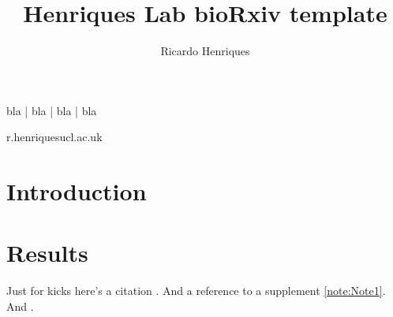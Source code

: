 \documentclass[times, twoside, watermark]{zHenriquesLab-StyleBioRxiv}
\begin{document}
\title{Henriques Lab bioRxiv template}

\author[1,\Letter]{Ricardo Henriques}


\maketitle

\begin{abstract}
\blindtext
\end {abstract}

\begin{keywords}
bla | bla | bla | bla
\end{keywords}

\begin{corrauthor}
r.henriques\at ucl.ac.uk
\end{corrauthor}

\section*{Introduction}
\Blindtext

\section*{Results}

Just for kicks here's a citation \cite{Gustafsson2016}. And a reference to a supplement \cref{note:Note1}. And .
\Blindtext
\end{document}
